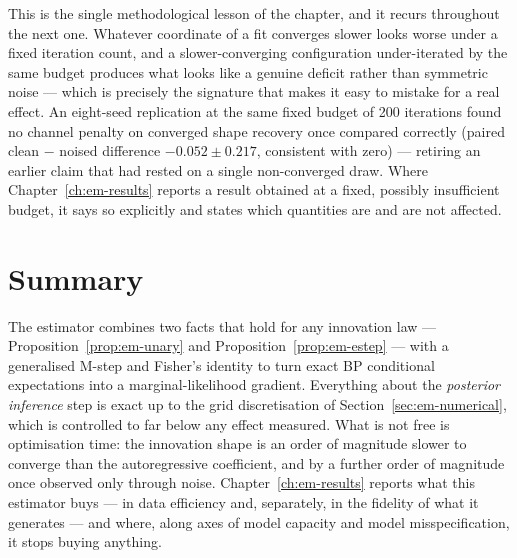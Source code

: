 \begin{remark}
\label{rmk:em-fixed-budget}
This is the single methodological lesson of the chapter, and it recurs
throughout the next one. Whatever coordinate of a fit converges slower looks
worse under a fixed iteration count, and a slower-converging configuration
under-iterated by the same budget produces what looks like a genuine deficit
rather than symmetric noise --- which is precisely the signature that makes it
easy to mistake for a real effect. An eight-seed replication at the same
fixed budget of 200 iterations found no channel penalty on converged shape
recovery once compared correctly (paired clean $-$ noised difference
$-0.052\pm0.217$, consistent with zero) --- retiring an earlier claim that
had rested on a single non-converged draw. Where Chapter~\ref{ch:em-results}
reports a result obtained at a fixed, possibly insufficient budget, it says so
explicitly and states which quantities are and are not affected.
\end{remark}

\section{Summary}

The estimator combines two facts that hold for any innovation law ---
Proposition~\ref{prop:em-unary} and Proposition~\ref{prop:em-estep} --- with a
generalised M-step and Fisher's identity to turn exact BP conditional
expectations into a marginal-likelihood gradient. Everything about the
\emph{posterior inference} step is exact up to the grid discretisation of
Section~\ref{sec:em-numerical}, which is controlled to far below any effect
measured. What is not free is optimisation time: the innovation shape is an
order of magnitude slower to converge than the autoregressive coefficient,
and by a further order of magnitude once observed only through noise.
Chapter~\ref{ch:em-results} reports what this estimator buys --- in data
efficiency and, separately, in the fidelity of what it generates --- and where,
along axes of model capacity and model misspecification, it stops buying
anything.
